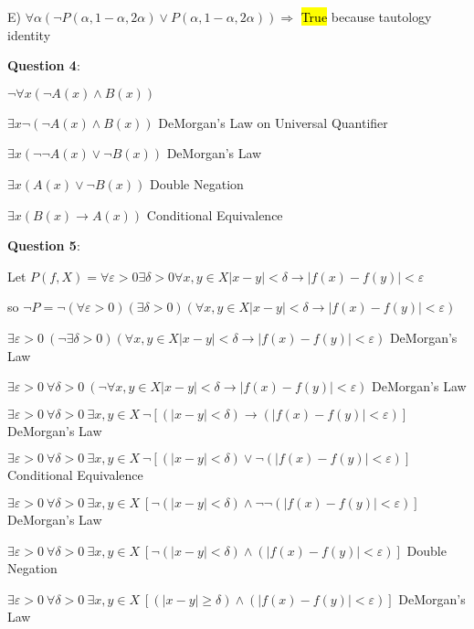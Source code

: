 \documentclass{article} %
\newcommand{\question}[2][]{\begin{flushleft}
        \textbf{Question #1}: \textit{#2}

\end{flushleft}}
\begin{document}
    E) $\forall \alpha (\neg P(\alpha, 1 - \alpha, 2 \alpha) \lor P(\alpha, 1-\alpha, 2\alpha)) \Rightarrow$ \hl{True} because tautology identity

    \question[4]{}

    $\neg \forall x (\neg A(x) \land B(x))$

    $\exists x \neg(\neg A(x) \land B(x))$ \tabto*{5cm} DeMorgan's Law on Universal Quantifier

    $\exists x (\neg \neg A(x) \lor \neg B(x))$ \tabto*{5cm} DeMorgan's Law

    $\exists x (A(x) \lor \neg B(x))$ \tabto*{5cm} Double Negation

    $\exists x (B(x) \rightarrow A(x))$ \tabto*{5cm} Conditional Equivalence

    \newpage

    \question[5]{}

    Let $P(f, X) = \forall \varepsilon > 0 \exists \delta > 0 \forall x, y \in X |x - y| < \delta \rightarrow |f(x) - f(y)| < \varepsilon$

    so $\neg P = \neg (\forall \varepsilon > 0) (\exists \delta > 0) (\forall x, y \in X |x - y| < \delta \rightarrow |f(x) - f(y)| < \varepsilon)$

    $\exists \varepsilon > 0\ (\neg \exists \delta > 0) (\forall x, y \in X |x - y| < \delta \rightarrow |f(x) - f(y)| < \varepsilon)$ \tabto*{11cm} DeMorgan's Law
    
    $\exists \varepsilon > 0\ \forall \delta > 0\ (\neg \forall x, y \in X |x - y| < \delta \rightarrow |f(x) - f(y)| < \varepsilon)$ \tabto*{11cm} DeMorgan's Law
    
    $\exists \varepsilon > 0\ \forall \delta > 0\ \exists x, y \in X\ \neg [(|x - y| < \delta) \rightarrow (|f(x) - f(y)| < \varepsilon)]$ \tabto*{11cm} DeMorgan's Law
    
    $\exists \varepsilon > 0\ \forall \delta > 0\ \exists x, y \in X\ \neg [(|x - y| < \delta) \lor \neg (|f(x) - f(y)| < \varepsilon)]$ \tabto*{11cm} Conditional Equivalence
    
    $\exists \varepsilon > 0\ \forall \delta > 0\ \exists x, y \in X\ [\neg (|x - y| < \delta) \land \neg \neg (|f(x) - f(y)| < \varepsilon)]$ \tabto*{11cm} DeMorgan's Law

    $\exists \varepsilon > 0\ \forall \delta > 0\ \exists x, y \in X\ [\neg (|x - y| < \delta) \land (|f(x) - f(y)| < \varepsilon)]$ \tabto*{11cm} Double Negation

    $\exists \varepsilon > 0\ \forall \delta > 0\ \exists x, y \in X\ [(|x - y| \geq \delta) \land (|f(x) - f(y)| < \varepsilon)]$ \tabto*{11cm} DeMorgan's Law
\end{document}
